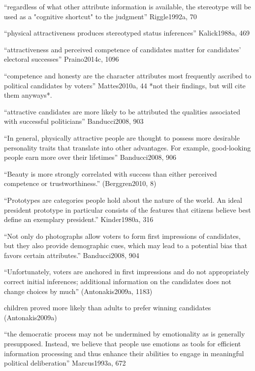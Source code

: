 		``regardless of what other attribute information is available, the stereotype will be used as a "cognitive shortcut" to the judgment'' Riggle1992a, 70

		``physical attractiveness produces stereotyped status inferences'' Kalick1988a, 469

		``attractiveness and perceived competence of candidates matter for candidates’ electoral successes'' Praino2014c, 1096



		``competence and honesty are the character attributes most frequently ascribed to political candidates by voters'' Mattes2010a, 44 *not their findings, but will cite them anyways*.	

		``attractive candidates are more likely to be attributed the qualities associated with successful politicians'' Banducci2008, 903

		``In general, physically attractive people are thought to possess more desirable personality traits that translate into other advantages. For example, good-looking people earn more over their lifetimes'' Banducci2008, 906

		``Beauty is more strongly correlated with success than either perceived competence or trustworthiness.'' (Berggren2010, 8)

		``Prototypes are categories people hold about the nature of the world. An ideal president prototype in particular consists of the features that citizens believe best define an exemplary president.'' Kinder1980a, 316




		``Not only do photographs allow voters to form first impressions of candidates, but they also provide demographic cues, which may lead to a potential bias that favors certain attributes.'' Banducci2008, 904

		``Unfortunately, voters are anchored in first impressions and do not appropriately correct initial inferences; additional information on the candidates does not change choices by much'' (Antonakis2009a, 1183)

		children proved more likely than adults to prefer winning candidates (Antonakis2009a)



		``the democratic process may not be undermined by emotionality as is generally presupposed. Instead, we believe that people use emotions as tools for efficient information processing and thus enhance their abilities to engage in meaningful political deliberation'' Marcus1993a, 672

